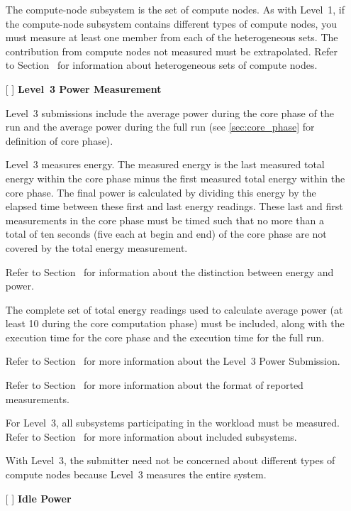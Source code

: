 \begin{itemize}
The compute-node subsystem is the set of compute nodes. As with Level~1, if the compute-node subsystem contains different types of compute nodes, you must measure at least one member from each of the heterogeneous sets. The contribution from compute nodes not measured must be extrapolated.
Refer to Section~ for information about heterogeneous sets of compute nodes.

\newpage
\item[{[ ]}]
\textbf{Level~3 Power Measurement}

Level~3 submissions include the average power during the core phase of the run and the average power during the full run (see \ref{sec:core_phase} for definition of core phase).

Level~3 measures energy.
The measured energy is the last measured total energy within the core phase minus the first measured total energy within the core phase.
The final power is calculated by dividing this energy by the elapsed time between these first and last energy readings.
These last and first measurements in the core phase must be timed such that no more than a total of ten seconds (five each at begin and end) of the core phase are not covered by the total energy measurement.

Refer to Section~ for information about the distinction between energy and power.

The complete set of total energy readings used to calculate average power (at least 10 during the core computation phase) must be included, along with the execution time for the core phase and the execution time for the full run.

Refer to Section~ for more information about the Level~3 Power Submission.

Refer to Section~ for more information about the format of reported measurements.

For Level~3, all subsystems participating in the workload must be measured. Refer to 
Section~ for more information about included subsystems.

With Level~3, the submitter need not be concerned about different types of compute nodes because Level~3 measures the entire system.


\item[{[ ]}]
\textbf{Idle Power}


\end{itemize}
